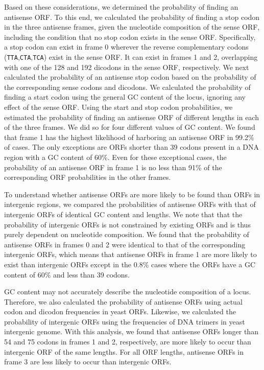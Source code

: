 \documentclass[12pt,a4paper]{article}
\begin{document}
Based on these considerations, we determined the probability of finding an antisense ORF. To this end, we calculated the probability of finding a stop codon in the three antisense frames, given the nucleotide composition of the sense ORF, including the condition that no stop codon exists in the sense ORF. Specifically, a stop codon can exist in frame 0 wherever the reverse complementary codons (\texttt{TTA},\texttt{CTA},\texttt{TCA}) exist in the sense ORF. It can exist in frames 1 and 2, overlapping with one of the 128 and 192 dicodons in the sense ORF, respectively. We next calculated the probability of an antisense stop codon based on the probability of the corresponding sense codons and dicodons. We calculated the probability of finding a start codon using the general GC content of the locus, ignoring any effect of the sense ORF. Using the start and stop codon probabilities, we estimated the probability of finding an antisense ORF of different lengths in each of the three frames. We did so for four different values of GC content. We found that frame 1 has the highest likelihood of harboring an antisense ORF in 99.2\% of cases. The only exceptions are ORFs shorter than 39 codons present in a DNA region with a GC content of 60\%. Even for these exceptional cases, the probability of an antisense ORF in frame 1 is no less than 91\% of the corresponding ORF probabilities in the other frames. 

To understand whether antisense ORFs are more likely to be found than ORFs in intergenic regions, we compared the probabilities of antisense ORFs with that of intergenic ORFs of identical GC content and lengths. We note that that the probability of intergenic ORFs is not constrained by existing ORFs and is thus purely dependent on nucleotide composition. We found that the probability of antisense ORFs in frames 0 and 2 were identical to that of the corresponding intergenic ORFs, which means that antisense ORFs in frame 1 are more likely to exist than intergenic ORFs except in the 0.8\% cases where the ORFs have a GC content of 60\% and less than 39 codons. 

GC content may not accurately describe the nucleotide composition of a locus. Therefore, we also calculated the probability of antisense ORFs using actual codon and dicodon frequencies in yeast ORFs. Likewise, we calculated the probability of intergenic ORFs using the frequencies of DNA trimers in yeast intergenic genome. With this analysis, we found that antisense ORFs longer than 54 and 75 codons in frames 1 and 2, respectively, are more likely to occur than intergenic ORF of the same lengths. For all ORF lengths, antisense ORFs in frame 3 are less likely to occur than intergenic ORFs.
\end{document}
